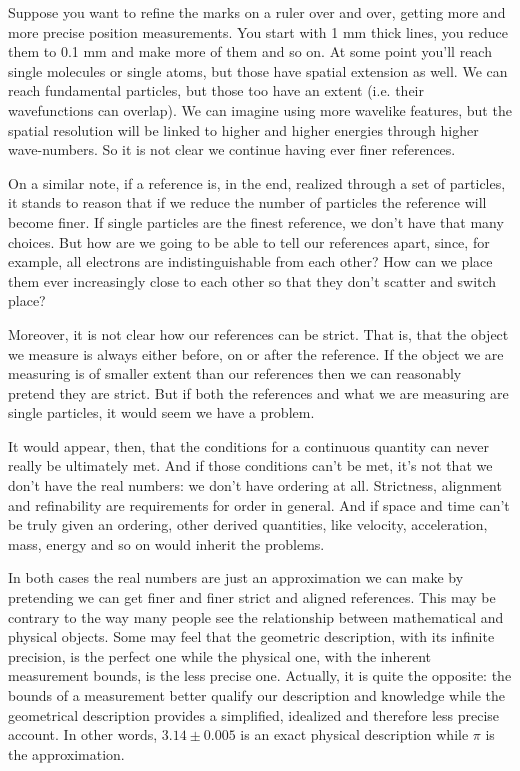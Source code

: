\documentclass[11pt,letterpaper,fleqn]{memoir} %
\begin{document}
Suppose you want to refine the marks on a ruler over and over, getting more and more precise position measurements. You start with 1 mm thick lines, you reduce them to 0.1 mm and make more of them and so on. At some point you'll reach single molecules or single atoms, but those have spatial extension as well. We can reach fundamental particles, but those too have an extent (i.e. their wavefunctions can overlap). We can imagine using more wavelike features, but the spatial resolution will be linked to higher and higher energies through higher wave-numbers. So it is not clear we continue having ever finer references.

On a similar note, if a reference is, in the end, realized through a set of particles, it stands to reason that if we reduce the number of particles the reference will become finer. If single particles are the finest reference, we don't have that many choices. But how are we going to be able to tell our references apart, since, for example, all electrons are indistinguishable from each other? How can we place them ever increasingly close to each other so that they don't scatter and switch place?

Moreover, it is not clear how our references can be strict. That is, that the object we measure is always either before, on or after the reference. If the object we are measuring is of smaller extent than our references then we can reasonably pretend they are strict. But if both the references and what we are measuring are single particles, it would seem we have a problem.

It would appear, then, that the conditions for a continuous quantity can never really be ultimately met. And if those conditions can't be met, it's not that we don't have the real numbers: we don't have ordering at all. Strictness, alignment and refinability are requirements for order in general. And if space and time can't be truly given an ordering, other derived quantities, like velocity, acceleration, mass, energy and so on would inherit the problems.

In both cases the real numbers are just an approximation we can make by pretending we can get finer and finer strict and aligned references. This may be contrary to the way many people see the relationship between mathematical and physical objects. Some may feel that the geometric description, with its infinite precision, is the perfect one while the physical one, with the inherent measurement bounds, is the less precise one. Actually, it is quite the opposite: the bounds of a measurement better qualify our description and knowledge while the geometrical description provides a simplified, idealized and therefore less precise account. In other words, $3.14 \pm 0.005$ is an exact physical description while  $\pi$ is the approximation.
\end{document}
